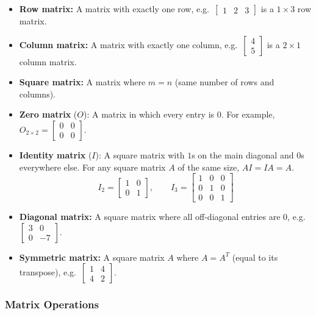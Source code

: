 \begin{itemize}[leftmargin=*]
  \item \textbf{Row matrix:} A matrix with exactly one row, e.g.\ $\begin{bmatrix} 1 & 2 & 3 \end{bmatrix}$ is a $1 \times 3$ row matrix.
  \item \textbf{Column matrix:} A matrix with exactly one column, e.g.\ $\begin{bmatrix} 4 \\ 5 \end{bmatrix}$ is a $2 \times 1$ column matrix.
  \item \textbf{Square matrix:} A matrix where $m = n$ (same number of rows and columns).
  \item \textbf{Zero matrix} ($O$): A matrix in which every entry is $0$. For example, $O_{2 \times 2} = \begin{bmatrix} 0 & 0 \\ 0 & 0 \end{bmatrix}$.
  \item \textbf{Identity matrix} ($I$): A square matrix with $1$s on the main diagonal and $0$s everywhere else. For any square matrix $A$ of the same size, $AI = IA = A$.
  \[
  I_2 = \begin{bmatrix} 1 & 0 \\ 0 & 1 \end{bmatrix}, \qquad
  I_3 = \begin{bmatrix} 1 & 0 & 0 \\ 0 & 1 & 0 \\ 0 & 0 & 1 \end{bmatrix}
  \]
  \item \textbf{Diagonal matrix:} A square matrix where all off-diagonal entries are $0$, e.g.\ $\begin{bmatrix} 3 & 0 \\ 0 & -7 \end{bmatrix}$.
  \item \textbf{Symmetric matrix:} A square matrix $A$ where $A = A^T$ (equal to its transpose), e.g.\ $\begin{bmatrix} 1 & 4 \\ 4 & 2 \end{bmatrix}$.
\end{itemize}

\subsubsection*{Matrix Operations}

